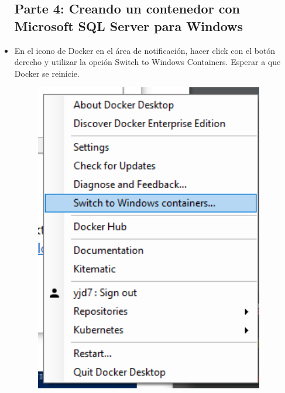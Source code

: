 \begin{itemize}
\subsection{Parte 4: Creando un contenedor con Microsoft SQL Server para Windows}
	\item En el icono de Docker en el área de notificación, hacer click con el botón derecho y utilizar la opción Switch to Windows Containers. Esperar a que Docker se reinicie.
                      \begin{figure}[H]
		\begin{center}
		\includegraphics[width=10cm]{./Imagenes/22}
		\end{center}
		\end{figure}   
                      \begin{figure}[H]
		\begin{center}

\end{center}
\end{figure}
\end{itemize}
